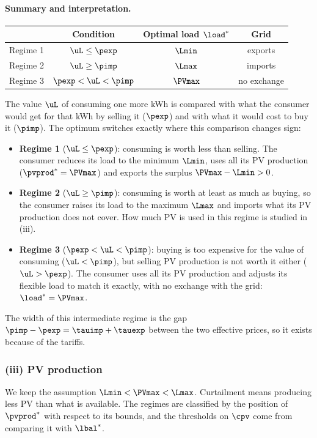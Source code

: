 \paragraph{Summary and interpretation.}
\begin{center}
\begin{tabular}{lccc}
    \toprule
    & Condition & Optimal load ${\load}^*$ & Grid \\
    \midrule
    Regime 1 & $\uL \leq \pexp$ & $\Lmin$ & exports \\
    Regime 2 & $\uL \geq \pimp$ & $\Lmax$ & imports \\
    Regime 3 & $\pexp < \uL < \pimp$ & $\PVmax$ & no exchange \\
    \bottomrule
\end{tabular}
\end{center}
The value $\uL$ of consuming one more kWh is compared with what the consumer would get for
that kWh by selling it ($\pexp$) and with what it would cost to buy it ($\pimp$). The optimum
switches exactly where this comparison changes sign:
\begin{itemize}
    \item \textbf{Regime 1} ($\uL \leq \pexp$): consuming is worth less than selling. The
    consumer reduces its load to the minimum $\Lmin$, uses all its PV production
    (${\pvprod}^* = \PVmax$) and exports the surplus $\PVmax - \Lmin > 0$.
    \item \textbf{Regime 2} ($\uL \geq \pimp$): consuming is worth at least as much as buying,
    so the consumer raises its load to the maximum $\Lmax$ and imports what its PV production
    does not cover. How much PV is used in this regime is studied in (iii).
    \item \textbf{Regime 3} ($\pexp < \uL < \pimp$): buying is too expensive for the value of
    consuming ($\uL < \pimp$), but selling PV production is not worth it either
    ($\uL > \pexp$). The consumer uses all its PV production and adjusts its flexible load to
    match it exactly, with no exchange with the grid: ${\load}^* = \PVmax$.
\end{itemize}
The width of this intermediate regime is the gap $\pimp - \pexp = \tauimp + \tauexp$ between
the two effective prices, so it exists because of the tariffs.

\subsubsection{(iii) PV production}
We keep the assumption $\Lmin < \PVmax < \Lmax$. Curtailment means producing less PV than what
is available. The regimes are classified by the position of ${\pvprod}^*$ with respect to its
bounds, and the thresholds on $\cpv$ come from comparing it with ${\lbal}^*$.

